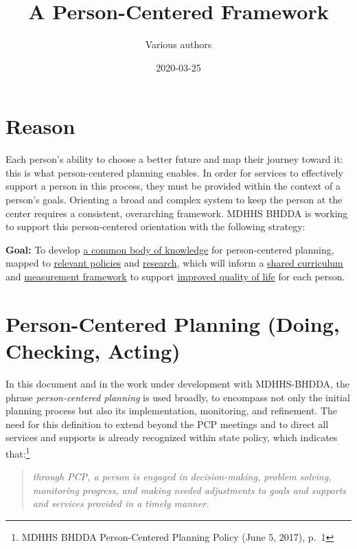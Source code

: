 \documentclass[
]{book}
\title{A Person-Centered Framework}
\author{Various authors}
\date{2020-03-25}
\begin{document}
\maketitle

{
\setcounter{tocdepth}{1}
\tableofcontents
}
\hypertarget{reason}{%
\chapter{Reason}\label{reason}}

Each person's ability to choose a better future and map their journey toward it: this is what person-centered planning enables. In order for services to effectively support a person in this process, they must be provided within the context of a person's goals. Orienting a broad and complex system to keep the person at the center requires a consistent, overarching framework. MDHHS BHDDA is working to support this person-centered orientation with the following strategy:

\textbf{Goal:} To develop \protect\hyperlink{bok}{a common body of knowledge} for person-centered planning,
mapped to \protect\hyperlink{policy}{relevant policies} and \protect\hyperlink{research}{research},
which will inform a \protect\hyperlink{curriculum}{shared curriculum}
and \protect\hyperlink{measure}{measurement framework}
to support \protect\hyperlink{pcpdca}{improved quality of life} for each person.

\hypertarget{pcpdca}{%
\chapter{Person-Centered Planning (Doing, Checking, Acting)}\label{pcpdca}}

In this document and in the work under development with MDHHS-BHDDA, the phrase \emph{person-centered planning} is used broadly, to encompass not only the initial planning process but also its implementation, monitoring, and refinement. The need for this definition to extend beyond the PCP meetings and to direct all services and supports is already recognized within state policy, which indicates that:\footnote{MDHHS BHDDA Person-Centered Planning Policy (June 5, 2017), p.~1}

\begin{quote}
\emph{through PCP, a person is engaged in decision-making, problem solving, monitoring progress, and making needed adjustments to goals and supports and services provided in a timely manner.}
\end{quote}
\end{document}
